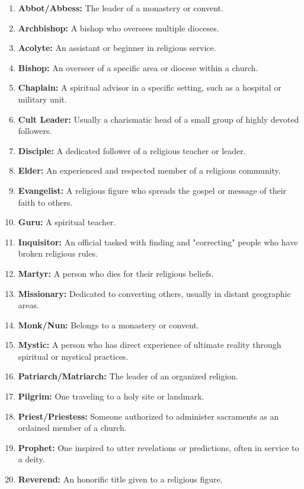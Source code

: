 \begin{enumerate}
    \item \textbf{Abbot/Abbess:} The leader of a monastery or convent.
    \item \textbf{Archbishop:} A bishop who oversees multiple dioceses.
    \item \textbf{Acolyte:} An assistant or beginner in religious service.
    \item \textbf{Bishop:} An overseer of a specific area or diocese within a church.
    \item \textbf{Chaplain:} A spiritual advisor in a specific setting, such as a hospital or military unit.
    \item \textbf{Cult Leader:} Usually a charismatic head of a small group of highly devoted followers.
    \item \textbf{Disciple:} A dedicated follower of a religious teacher or leader.
    \item \textbf{Elder:} An experienced and respected member of a religious community.
    \item \textbf{Evangelist:} A religious figure who spreads the gospel or message of their faith to others.
    \item \textbf{Guru:} A spiritual teacher.
    \item \textbf{Inquisitor:} An official tasked with finding and "correcting" people who have broken religious rules.
    \item \textbf{Martyr:} A person who dies for their religious beliefs.
    \item \textbf{Missionary:} Dedicated to converting others, usually in distant geographic areas.
    \item \textbf{Monk/Nun:} Belongs to a monastery or convent.
    \item \textbf{Mystic:} A person who has direct experience of ultimate reality through spiritual or mystical practices.
    \item \textbf{Patriarch/Matriarch:} The leader of an organized religion.
    \item \textbf{Pilgrim:} One traveling to a holy site or landmark.
    \item \textbf{Priest/Priestess:} Someone authorized to administer sacraments as an ordained member of a church.
    \item \textbf{Prophet:} One inspired to utter revelations or predictions, often in service to a deity.
    \item \textbf{Reverend:} An honorific title given to a religious figure.

\end{enumerate}
